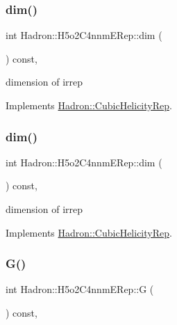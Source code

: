 \subsubsection{\texorpdfstring{dim()}{dim()}\hspace{0.1cm}{\footnotesize\ttfamily [1/2]}}
{\footnotesize\ttfamily int Hadron\+::\+H5o2\+C4nnm\+E\+Rep\+::dim (\begin{DoxyParamCaption}{ }\end{DoxyParamCaption}) const\hspace{0.3cm}{\ttfamily [inline]}, {\ttfamily [virtual]}}

dimension of irrep 

Implements \mbox{\hyperlink{structHadron_1_1CubicHelicityRep_a95d229a05580e65f8bdde74a1e316855}{Hadron\+::\+Cubic\+Helicity\+Rep}}.

\mbox{\label{structHadron_1_1H5o2C4nnmERep_accbf09b2922edd15ef55ad93a6d69777}} 
\subsubsection{\texorpdfstring{dim()}{dim()}\hspace{0.1cm}{\footnotesize\ttfamily [2/2]}}
{\footnotesize\ttfamily int Hadron\+::\+H5o2\+C4nnm\+E\+Rep\+::dim (\begin{DoxyParamCaption}{ }\end{DoxyParamCaption}) const\hspace{0.3cm}{\ttfamily [inline]}, {\ttfamily [virtual]}}

dimension of irrep 

Implements \mbox{\hyperlink{structHadron_1_1CubicHelicityRep_a95d229a05580e65f8bdde74a1e316855}{Hadron\+::\+Cubic\+Helicity\+Rep}}.

\mbox{\label{structHadron_1_1H5o2C4nnmERep_a4bfc67bc8a4c5f245f5e2917a2eaf51e}} 
\subsubsection{\texorpdfstring{G()}{G()}\hspace{0.1cm}{\footnotesize\ttfamily [1/2]}}
{\footnotesize\ttfamily int Hadron\+::\+H5o2\+C4nnm\+E\+Rep\+::G (\begin{DoxyParamCaption}{ }\end{DoxyParamCaption}) const\hspace{0.3cm}{\ttfamily [inline]}, {\ttfamily [virtual]}}

